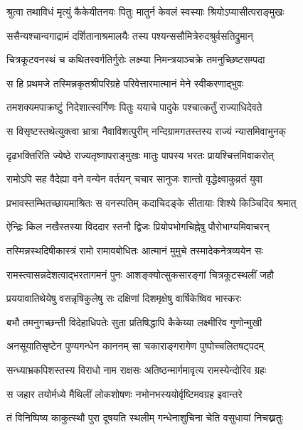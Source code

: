 \twolineshloka
{श्रुत्वा तथाविधं मृत्युं कैकेयीतनयः पितुः}
{मातुर्न केवलं स्वस्याः श्रियोऽप्यासीत्पराङ्मुखः} %

\twolineshloka
{ससैन्यश्चान्वगाद्रामं दर्शितानाश्रमालयैः}
{तस्य पश्यन्ससौमित्रेरुदश्रुर्वसतिद्रुमान्} %

\twolineshloka
{चित्रकूटवनस्थं च कथितस्वर्गतिर्गुरोः}
{लक्ष्म्या निमन्त्रयाञ्चक्रे तमनुच्छिष्टसम्पदा} %

\twolineshloka
{स हि प्रथमजे तस्मिन्नकृतश्रीपरिग्रहे}
{परिवेत्तारमात्मानं मेने स्वीकरणाद्भुवः} %

\twolineshloka
{तमशक्यमपाक्रष्टुं निदेशात्स्वर्गिणः पितुः}
{ययाचे पादुके पश्चात्कर्तुं राज्याधिदेवते} %

\twolineshloka
{स विसृष्टस्तथेत्युक्त्वा भ्रात्रा नैवाविशत्पुरीम्}
{नन्दिग्रामगतस्तस्य राज्यं न्यासमिवाभुनक्} %

\twolineshloka
{दृढभक्तिरिति ज्येष्ठे राज्यतृष्णापराङ्मुखः}
{मातुः पापस्य भरतः प्रायश्चित्तमिवाकरोत्} %

\twolineshloka
{रामोऽपि सह वैदेह्या वने वन्येन वर्तयन्}
{चचार सानुजः शान्तो वृद्धेक्ष्वाकुव्रतं युवा} %

\twolineshloka
{प्रभावस्तम्भितच्छायमाश्रितः स वनस्पतिम्}
{कदाचिदङ्के सीतायाः शिश्ये किञ्चिदिव श्रमात्} %

\twolineshloka
{ऐन्द्रिः किल नखैस्तस्या विददार स्तनौ द्विजः}
{प्रियोपभोगचिह्नेषु पौरोभाग्यमिवाचरन्} %

\twolineshloka
{तस्मिन्नस्थदिषीकास्त्रं रामो रामावबोधितः}
{आत्मानं मुमुचे तस्मादेकनेत्रव्ययेन सः} %

\twolineshloka
{रामस्त्वासन्नदेशत्वाद्भरतागमनं पुनः}
{आशङ्क्योत्सुकसारङ्गां चित्रकूटस्थलीं जहौ} %

\twolineshloka
{प्रययावातिथेयेषु वसन्नृषिकुलेषु सः}
{दक्षिणां दिशमृक्षेषु वार्षिकेष्विव भास्करः} %

\twolineshloka
{बभौ तमनुगच्छन्ती विदेहाधिपतेः सुता}
{प्रतिषिद्धापि कैकेय्या लक्ष्मीरिव गुणोन्मुखी} %

\twolineshloka
{अनसूयातिसृष्टेन पुण्यगन्धेन काननम्}
{सा चकाराङ्गरागेण पुष्पोच्चलितषट्पदम्} %

\twolineshloka
{सन्ध्याभ्रकपिशस्तस्य विराधो नाम राक्षसः}
{अतिष्ठन्मार्गमावृत्य रामस्येन्दोरिव ग्रहः} %

\twolineshloka
{स जहार तयोर्मध्ये मैथिलीं लोकशोषणः}
{नभोनभस्ययोर्वृष्टिमवग्रह इवान्तरे} %

\twolineshloka
{तं विनिष्पिष्य काकुत्स्थौ पुरा दूषयति स्थलीम्}
{गन्धेनाशुचिना चेति वसुधायां निचख्नतुः} %

